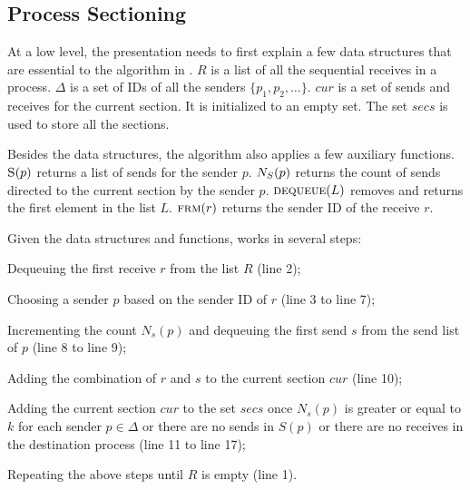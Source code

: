 \subsection{Process Sectioning}

At a low level, the presentation needs to first explain a few data structures that are essential to the algorithm in .
$R$ is a list of all the sequential receives in a process.
$\Delta$ is a set of IDs of all the senders $\{p_1, p_2, \ldots\}$.
$\mathit{cur}$ is a set of sends and receives for the current section. It is initialized to an empty set.
The set $\mathit{secs}$ is used to store all the sections.

Besides the data structures, the algorithm also applies a few auxiliary functions. 
$\Call{S}{p}$ returns a list of sends for the sender $p$.
$\Call{$N_S$}{p}$ returns the count of sends directed to the current section by the sender $p$.
$\Call{dequeue}{L}$ removes and returns the first element in the list $L$.
$\Call{frm}{r}$ returns the sender ID of the receive $r$.

Given the data structures and functions,  works in several steps: 
\begin{compactenum}
\item Dequeuing the first receive $r$ from the list $R$ (line 2);
\item Choosing a sender $p$ based on the sender ID of $r$ (line 3 to line 7);
\item Incrementing the count $N_s(p)$ and dequeuing the first send $s$ from the send list of $p$ (line 8 to line 9);
\item Adding the combination of $r$ and $s$ to the current section $\mathit{cur}$ (line 10);
\item Adding the current section $\mathit{cur}$ to the set $\mathit{secs}$ once $N_s(p)$ is greater or equal to $k$ for each sender $p\in\Delta$ or there are no sends in $S(p)$ or there are no receives in the destination process (line 11 to line 17);
\item Repeating the above steps until $R$ is empty (line 1).
\end{compactenum}



